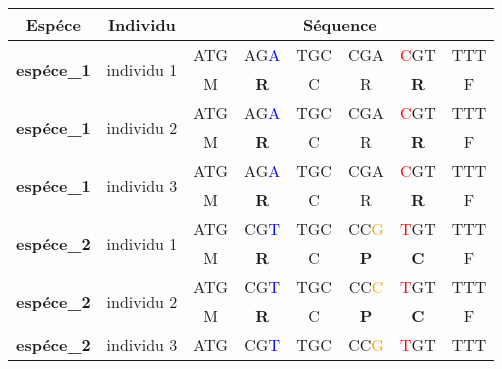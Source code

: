 \documentclass[../main]{subfiles} %
\begin{document}



\begin{table}[]
    \centering
    \begin{tabular}{cccccccc}
        \toprule
        \textbf{Espéce}                     & \textbf{Individu}             & \multicolumn{6}{c}{\textbf{Séquence}} \\
        \midrule
        \multirow{2}{*}{\textbf{espéce\_1}} & \multirow{2}{*}{individu   1} & ATG  & AG\textcolor{blue}{A}  & TGC  & CGA  & \textcolor{red}{C}GT & TTT \\
                                            &                               & M    & \textbf{R}    & C    & R    & \textbf{R}   & F   \\
        \midrule
        \multirow{2}{*}{\textbf{espéce\_1}} & \multirow{2}{*}{individu 2}   & ATG  & AG\textcolor{blue}{A} & TGC  & CGA  & \textcolor{red}{C}GT & TTT \\
                                            &                               & M    & \textbf{R}    & C    & R    & \textbf{R}   & F   \\
        \midrule
        \multirow{2}{*}{\textbf{espéce\_1}} & \multirow{2}{*}{individu 3}   & ATG  & AG\textcolor{blue}{A}  & TGC  & CGA  & \textcolor{red}{C}GT & TTT \\
                                            &                               & M    & \textbf{R}    & C    & R    & \textbf{R}   & F   \\
        \midrule
        \multirow{2}{*}{\textbf{espéce\_2}} & \multirow{2}{*}{individu 1}   & ATG  & CG\textcolor{blue}{T}  & TGC  & CC\textcolor{orange}{G}  & \textcolor{red}{T}GT & TTT \\
                                            &                               & M    & \textbf{R}    & C    & \textbf{P}    & \textbf{C}   & F   \\
        \midrule
        \multirow{2}{*}{\textbf{espéce\_2}} & \multirow{2}{*}{individu 2}   & ATG  & CG\textcolor{blue}{T}  & TGC  & CC\textcolor{orange}{C}  & \textcolor{red}{T}GT & TTT \\
                                            &                               & M    & \textbf{R}    & C    & \textbf{P}    & \textbf{C}   & F   \\
        \midrule
        \multirow{2}{*}{\textbf{espéce\_2}} & \multirow{2}{*}{individu 3}   & ATG  & CG\textcolor{blue}{T}  & TGC  & CC\textcolor{orange}{G}  & \textcolor{red}{T}GT & TTT \\

\end{tabular}
\end{table}
\end{document}
